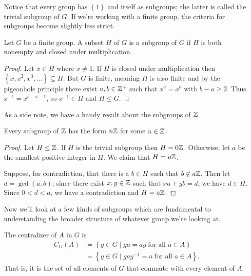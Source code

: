 \documentclass[../m171main.tex]{subfiles}
\begin{document}
Notice that every group has $\left\{ 1 \right\}$ and itself as subgroups; the latter is called the trivial subgroup of $G$.
If we're working with a finite group, the criteria for subgroups become slightly less strict.

\begin{theorem}[]
    Let $G$ be a finite group.
    A subset $H$ of $G$ is a subgroup of $G$ if $H$ is both nonempty and closed under multiplication.
\end{theorem}

\begin{proof}
    Let $x \in H$ where $x \neq 1$.
    If $H$ is closed under multiplication then $\left\{ x, x^2, x^3, \ldots \right\} \subseteq H$.
    But $G$ is finite, meaning $H$ is also finite and by the pigeonhole principle there exist $a,b \in \mathbb{Z}^+$ such that $x^{a} = x^{b}$ with $b-a \geq 2$.
    Thus $x^{-1} = x^{b-a-1}$, so $x^{-1} \in H$ and $H \leq G$.
\end{proof}

As a side note, we have a handy result about the subgroups of $\mathbb{Z}$.

\begin{theorem}
    Every subgroup of $\mathbb{Z}$ has the form $n\mathbb{Z}$ for some $n \in \mathbb{Z}$.
\end{theorem}

\begin{proof}
    Let $H \leq \mathbb{Z}$.
    If $H$ is the trivial subgroup then $H = 0\mathbb{Z}$.
    Otherwise, let $a$ be the smallest positive integer in $H$.
    We claim that $H = a\mathbb{Z}$.

    Suppose, for contradiction, that there is a $b \in H$ such that $b \not\in a\mathbb{Z}$.
    Then let $d = \gcd(a,b)$; since there exist $x,y \in \mathbb{Z}$ such that $xa + yb = d$, we have $d \in H$.
    Since $0 < d < a$, we have a contradiction and $H = a\mathbb{Z}$.
\end{proof}

Now we'll look at a few kinds of subgroups which are fundamental to understanding the broader structure of whatever group we're looking at.

\pagebreak

\begin{definition}[Centralizer]
    The centralizer of $A$ in $G$ is
    \begin{align*}
        C_G(A) &= \left\{ g \in G \mid ga = ag \;\text{for all $a \in A$} \right\} \\
        &= \left\{ g \in G \mid gag^{-1} = a \;\text{for all $a \in A$} \right\}.
    \end{align*}
    That is, it is the set of all elements of $G$ that commute with every element of $A$.
\end{definition}
\end{document}
